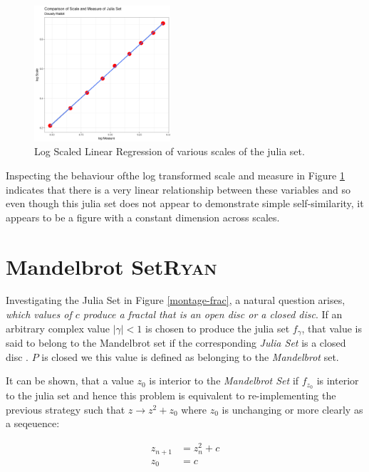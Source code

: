\documentclass[a4paper,11pt,twoside]{article}
\begin{document}
\begin{figure}[htbp]
\centering
\includegraphics[width=0.45\textwidth]{media/r-ggplot-linear-reg-julia.png}
\caption{\label{fig:lin-reg-dim}Log Scaled Linear Regression of various scales of the julia set.}
\end{figure}


Inspecting the behaviour ofthe log transformed scale and measure in Figure
\ref{fig:lin-reg-dim} indicates that there is a very linear relationship between these
variables and so even though this julia set does not appear to demonstrate
simple self-similarity, it appears to be a figure with a constant dimension
across scales.
\section{Mandelbrot Set\hfill{}\textsc{Ryan}}
\label{mandlebrot-set}
Investigating the Julia Set in Figure \ref{montage-frac}, a natural question arises, \emph{which values of \(c\)
produce a fractal that is an open disc or a closed disc}. If an arbitrary complex value \(\left\lvert \gamma \right \rvert < 1\)
is chosen to produce the julia set \(f_{\gamma}\), that value is said to belong to the Mandelbrot set if the corresponding \emph{Julia Set} is a closed disc \cite[Ch. 14]{peitgenChaosFractalsNew2004}.
\(P\) is closed we this value is defined as belonging to the \emph{Mandelbrot} set.

It can be shown, that a value \(z_{0}\) is interior to the \emph{Mandelbrot Set} if \(f_{z_{0}}\) is interior to the julia set and hence this problem is equivalent to re-implementing the previous strategy such that \(z \rightarrow z^{2} + z_{0}\) where \(z_{0}\) is unchanging or more clearly as a seqeuence:

\begin{align}
z_{n+1} &= z^{2}_n + c \label{eq:mb-sequence} \\
z_{0}   &= c
\end{align}
\end{document}
